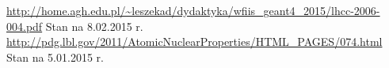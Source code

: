 \documentclass[11pt]{article}
\begin{document}
\begin{thebibliography}{99}
 \url{http://home.agh.edu.pl/~leszekad/dydaktyka/wfiis_geant4_2015/lhcc-2006-004.pdf} Stan na 8.02.2015 r.
 \url{http://pdg.lbl.gov/2011/AtomicNuclearProperties/HTML_PAGES/074.html} Stan na 5.01.2015 r.
\end{thebibliography}
\end{document}
